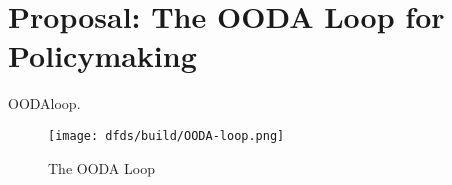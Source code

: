 \wickedtipsend


\section{Proposal: The OODA Loop for Policymaking}

\ac{OODAloop}.

\begin{figure}[h]
    \centering\CaptionFontSize
    \texttt{[image: dfds/build/OODA-loop.png]}
    \caption[The OODA Loop]{The OODA Loop}
    \label{fig-ooda-loop}
\end{figure}
